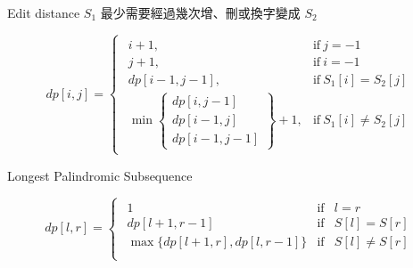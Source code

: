 Edit distance $S_1$ 最少需要經過幾次增、刪或換字變成 $S_2$
\begin{tiny}
    \[
        dp[i,j] = 
        \begin{cases}
            \begin{array}{cl}
                i+1, & \mbox{if} \ j=-1 \\
                j+1, & \mbox{if} \ i=-1 \\
                dp[i-1,j-1], & \mbox{if} \ S_1[i] = S_2[j] \\
                \min\left \{
                    \begin{array}{c}
                        dp[i,j-1] \\ dp[i-1,j] \\ dp[i-1,j-1]
                    \end{array}\right
                \}+1, & \mbox{if} \ S_1[i] \neq S_2[j]
            \end{array}
        \end{cases}
    \]
\end{tiny}

{\raggedright
    Longest Palindromic Subsequence \par
}
\begin{tiny}
    \[
        dp[l,r] =
        \begin{cases}
            \begin{array}{crc}
                1 & \mbox{if} & l = r \\
                dp[l+1,r-1] & \mbox{if} & S[l] = S[r] \\
                \max\{dp[l+1,r], dp[l,r-1]\} & \mbox{if} & S[l] \neq S[r] \\
            \end{array}
        \end{cases}
    \]
\end{tiny}